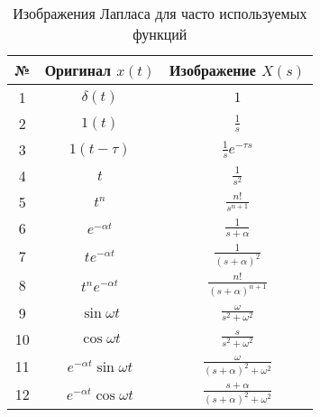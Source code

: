 \documentclass[../../TAU.tex]{subfiles}
\begin{document}
    \begin{table}
        \begin{center}
            \begin{tabular}{|c|c|c|}
            \hline 
            № & Оригинал $x(t)$ & Изображение $X(s)$\\ \hline
            1 & $\delta(t)$ & $1$ \\ \hline
            2 & $1(t)$ & $\frac{1}{s}$ \\ \hline
            3 & $1(t-\tau)$ & $\frac{1}{s} e^{-\tau s}$ \\ \hline
            4 & $t$ & $\frac{1}{s^2}$ \\ \hline
            5 & $t^n$ & $\frac{n!}{s^{n+1}}$ \\ \hline
            6 & $e^{-\alpha t}$ & $\frac{1}{s+\alpha}$ \\ \hline
            7 & $t e^{-\alpha t}$ & $\frac{1}{(s+\alpha)^2}$ \\ \hline
            8 & $t^n e^{-\alpha t}$ & $\frac{n!}{(s+\alpha)^{n+1}}$ \\ \hline
            9 & $\sin{\omega t}$ & $\frac{\omega}{s^2 + \omega^2}$ \\ \hline
            10 & $\cos{\omega t}$ & $\frac{s}{s^2+\omega^2}$ \\ \hline
            11 & $e^{-\alpha t} \sin{\omega t}$ & $\frac{\omega}{(s+\alpha)^2+\omega^2}$ \\ \hline
            12 & $e^{-\alpha t} \cos{\omega t}$ & $\frac{s+\alpha}{(s+\alpha)^2+\omega^2}$ \\ \hline
            \end{tabular}
            \caption{Изображения Лапласа для часто используемых функций}
        \end{center}
    \end{table}
\end{document}

